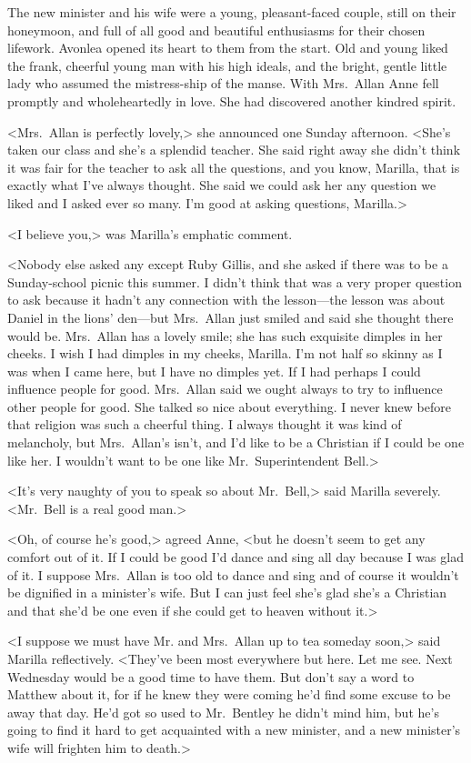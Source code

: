 The new minister and his wife were a young, pleasant-faced couple, still on their honeymoon, and full of all good and beautiful enthusiasms for their chosen lifework. Avonlea opened its heart to them from the start. Old and young liked the frank, cheerful young man with his high ideals, and the bright, gentle little lady who assumed the mistress-ship of the manse. With Mrs.~Allan Anne fell promptly and wholeheartedly in love. She had discovered another kindred spirit.

<Mrs.~Allan is perfectly lovely,> she announced one Sunday afternoon. <She's taken our class and she's a splendid teacher. She said right away she didn't think it was fair for the teacher to ask all the questions, and you know, Marilla, that is exactly what I've always thought. She said we could ask her any question we liked and I asked ever so many. I'm good at asking questions, Marilla.>

<I believe you,> was Marilla's emphatic comment.

<Nobody else asked any except Ruby Gillis, and she asked if there was to be a Sunday-school picnic this summer. I didn't think that was a very proper question to ask because it hadn't any connection with the lesson—the lesson was about Daniel in the lions' den—but Mrs.~Allan just smiled and said she thought there would be. Mrs.~Allan has a lovely smile; she has such exquisite dimples in her cheeks. I wish I had dimples in my cheeks, Marilla. I'm not half so skinny as I was when I came here, but I have no dimples yet. If I had perhaps I could influence people for good. Mrs.~Allan said we ought always to try to influence other people for good. She talked so nice about everything. I never knew before that religion was such a cheerful thing. I always thought it was kind of melancholy, but Mrs.~Allan's isn't, and I'd like to be a Christian if I could be one like her. I wouldn't want to be one like Mr.~Superintendent Bell.>

<It's very naughty of you to speak so about Mr.~Bell,> said Marilla severely. <Mr.~Bell is a real good man.>

<Oh, of course he's good,> agreed Anne, <but he doesn't seem to get any comfort out of it. If I could be good I'd dance and sing all day because I was glad of it. I suppose Mrs.~Allan is too old to dance and sing and of course it wouldn't be dignified in a minister's wife. But I can just feel she's glad she's a Christian and that she'd be one even if she could get to heaven without it.>

<I suppose we must have Mr. and Mrs.~Allan up to tea someday soon,> said Marilla reflectively. <They've been most everywhere but here. Let me see. Next Wednesday would be a good time to have them. But don't say a word to Matthew about it, for if he knew they were coming he'd find some excuse to be away that day. He'd got so used to Mr.~Bentley he didn't mind him, but he's going to find it hard to get acquainted with a new minister, and a new minister's wife will frighten him to death.>

